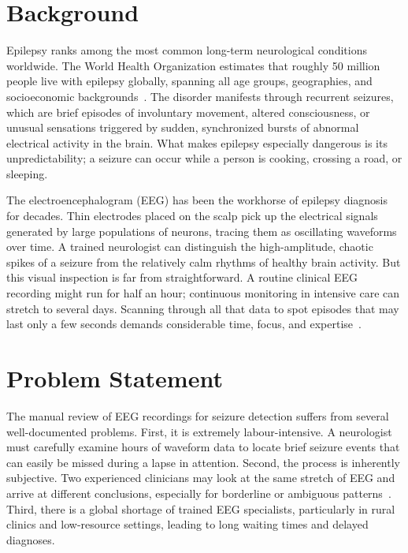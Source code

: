 
\section{Background}

Epilepsy ranks among the most common long-term neurological conditions worldwide. The World Health Organization estimates that roughly 50 million people live with epilepsy globally, spanning all age groups, geographies, and socioeconomic backgrounds~\citep{who2019epilepsy, chanu2023automated}. The disorder manifests through recurrent seizures, which are brief episodes of involuntary movement, altered consciousness, or unusual sensations triggered by sudden, synchronized bursts of abnormal electrical activity in the brain. What makes epilepsy especially dangerous is its unpredictability; a seizure can occur while a person is cooking, crossing a road, or sleeping.

The electroencephalogram (EEG) has been the workhorse of epilepsy diagnosis for decades. Thin electrodes placed on the scalp pick up the electrical signals generated by large populations of neurons, tracing them as oscillating waveforms over time. A trained neurologist can distinguish the high-amplitude, chaotic spikes of a seizure from the relatively calm rhythms of healthy brain activity. But this visual inspection is far from straightforward. A routine clinical EEG recording might run for half an hour; continuous monitoring in intensive care can stretch to several days. Scanning through all that data to spot episodes that may last only a few seconds demands considerable time, focus, and expertise~\citep{adeli2003analysis}.

\section{Problem Statement}

The manual review of EEG recordings for seizure detection suffers from several well-documented problems. First, it is extremely labour-intensive. A neurologist must carefully examine hours of waveform data to locate brief seizure events that can easily be missed during a lapse in attention. Second, the process is inherently subjective. Two experienced clinicians may look at the same stretch of EEG and arrive at different conclusions, especially for borderline or ambiguous patterns~\citep{chanu2023automated}. Third, there is a global shortage of trained EEG specialists, particularly in rural clinics and low-resource settings, leading to long waiting times and delayed diagnoses.

